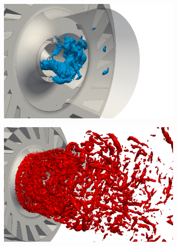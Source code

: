 




\begin{figure}[ht]
\centering
\begin{subfigure}[b]{0.4\textwidth}
	\centering
   \includegraphics[scale=0.35]{./part3_applications/figures_ch7_aero/BIMER_application_PVC/PVC_P_m3000}
   \label{fig:BIMER_application_PVC}
\end{subfigure}
\hspace{0.8in}
\begin{subfigure}[b]{0.4\textwidth}
\centering
   \includegraphics[scale=0.35]{./part3_applications/figures_ch7_aero/BIMER_application_PVC/Q_crit_2e8}

\end{subfigure}
\end{figure}
